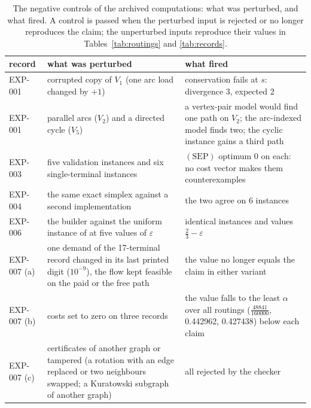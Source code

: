 \begin{table}[t]
\centering\footnotesize
\begin{tabular}{@{}>{\raggedright\arraybackslash}p{1.2cm}>{\raggedright\arraybackslash}p{5.7cm}>{\raggedright\arraybackslash}p{5.3cm}@{}}
\toprule
record & what was perturbed & what fired\\
\midrule
EXP-001 & corrupted copy of $V_1$ (one arc load changed by $+1$) & conservation fails at $s$: divergence 3, expected 2\\
EXP-001 & parallel arcs ($V_2$) and a directed cycle ($V_5$) & a vertex-pair model would find one path on $V_2$; the arc-indexed model finds two; the cyclic instance gains a third path\\
EXP-003 & five validation instances and six single-terminal instances & $(\mathrm{SEP})$ optimum $0$ on each: no cost vector makes them counterexamples\\
EXP-004 & the same exact simplex against a second implementation & the two agree on 6 instances\\
EXP-006 & the builder against the uniform instance of \cite{Afr26} at five values of $\varepsilon$ & identical instances and values $\tfrac23-\varepsilon$\\
EXP-007 (a) & one demand of the 17-terminal record changed in its last printed digit ($10^{-9}$), the flow kept feasible on the paid or the free path & the value no longer equals the claim in either variant\\
EXP-007 (b) & costs set to zero on three records & the value falls to the least $\alpha$ over all routings ($\tfrac{48841}{160000}$, 0.442962, 0.427438) below each claim\\
EXP-007 (c) & 7 certificates of another graph or tampered (a rotation with an edge replaced or two neighbours swapped; a Kuratowski subgraph of another graph) & all rejected by the checker\\
\bottomrule
\end{tabular}
\caption{The negative controls of the archived computations: what was perturbed, and what fired. A control is passed when the perturbed input is rejected or no longer reproduces the claim; the unperturbed inputs reproduce their values in Tables~\ref{tab:routings} and \ref{tab:records}.}
\label{tab:controls}
\end{table}
